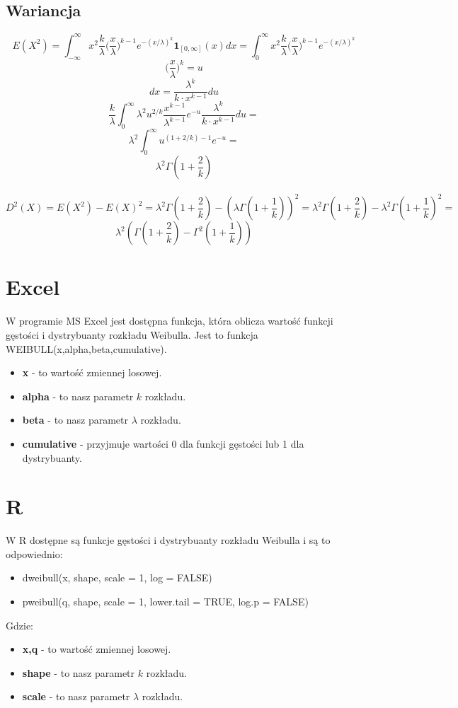 \documentclass{article}
\begin{document}
\subsection{Wariancja}
$$E(X^2) = \int_{-\infty}^{\infty} x^2 \frac{k}{\lambda} \Big( \frac{x}{\lambda} \Big)^{k-1} e^{-(x/\lambda)^k}  \boldsymbol{1}_{[0,\infty]}(x)dx = \int_{0}^{\infty} x^2 \frac{k}{\lambda} \Big( \frac{x}{\lambda} \Big)^{k-1} e^{-(x/\lambda)^k}$$
$$\Big( \frac{x}{\lambda} \Big) ^k = u$$
$$dx = \frac{\lambda^{k}}{k\cdot x^{k-1}}du$$
$$\frac{k}{\lambda} \int_{0}^{\infty} \lambda^2 u^{2/k} \frac{x^{k-1}} {\lambda^{k-1}} e^{-u} \frac{\lambda^{k}}{k\cdot x^{k-1}}du=$$
$$\lambda^2 \int_{0}^{\infty}u^{(1+2/k)-1}e^{-u}=$$
$$\lambda^2 \Gamma (1+\frac{2}{k})$$
\\
$$D^2(X) = E(X^2) - E(X)^2 = \lambda^2 \Gamma (1+\frac{2}{k}) - (\lambda \Gamma (1+\frac{1}{k}))^2 = \lambda^2 \Gamma (1+\frac{2}{k}) - \lambda^2 \Gamma (1+\frac{1}{k})^2=$$
$$\lambda^2 ( \Gamma (1+\frac{2}{k}) -  \Gamma^2 (1+\frac{1}{k}))$$

\section{Excel}
W programie MS Excel jest dostępna funkcja, która oblicza wartość funkcji gęstości i dystrybuanty rozkładu Weibulla. Jest to funkcja WEIBULL(x,alpha,beta,cumulative).
\begin{itemize}
\item \textbf{x} - to wartość zmiennej losowej.
\item \textbf{alpha} - to nasz parametr $k$ rozkładu.
\item \textbf{beta} - to nasz parametr $\lambda$ rozkładu.
\item \textbf{cumulative} - przyjmuje wartości 0 dla funkcji gęstości lub 1 dla dystrybuanty.
\end{itemize}

\newpage
\section{R}
W R dostępne są funkcje gęstości i dystrybuanty rozkładu Weibulla i są to odpowiednio:
\begin{itemize} 
\item dweibull(x, shape, scale = 1, log = FALSE)
\item pweibull(q, shape, scale = 1, lower.tail = TRUE, log.p = FALSE)
\end{itemize}
Gdzie:
\begin{itemize}
\item \textbf{x,q} - to wartość zmiennej losowej.
\item \textbf{shape} - to nasz parametr $k$ rozkładu.
\item \textbf{scale} - to nasz parametr $\lambda$ rozkładu.
\end{itemize}
\end{document}
